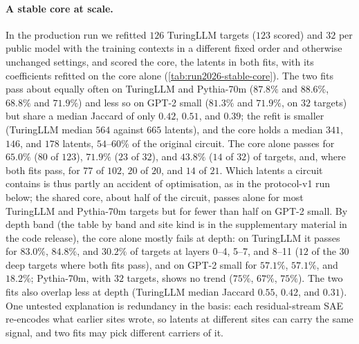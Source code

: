 \documentclass[10pt]{article}
\begin{document}
\paragraph{A stable core at scale.}
In the production run we refitted $126$ TuringLLM targets ($123$ scored) and $32$ per public model with the training contexts in a different fixed order and otherwise unchanged settings, and scored the core, the latents in both fits, with its coefficients refitted on the core alone (\cref{tab:run2026-stable-core}).
The two fits pass about equally often on TuringLLM and Pythia-70m ($87.8\%$ and $88.6\%$, $68.8\%$ and $71.9\%$) and less so on GPT-2 small ($81.3\%$ and $71.9\%$, on $32$ targets) but share a median Jaccard of only $0.42$, $0.51$, and $0.39$; the refit is smaller (TuringLLM median $564$ against $665$ latents), and the core holds a median $341$, $146$, and $178$ latents, $54$--$60\%$ of the original circuit.
The core alone passes for $65.0\%$ ($80$ of $123$), $71.9\%$ ($23$ of $32$), and $43.8\%$ ($14$ of $32$) of targets, and, where both fits pass, for $77$ of $102$, $20$ of $20$, and $14$ of $21$.
Which latents a circuit contains is thus partly an accident of optimisation, as in the protocol-v1 run below; the shared core, about half of the circuit, passes alone for most TuringLLM and Pythia-70m targets but for fewer than half on GPT-2 small.
By depth band (the table by band and site kind is in the supplementary material in the code release), the core alone mostly fails at depth: on TuringLLM it passes for $83.0\%$, $84.8\%$, and $30.2\%$ of targets at layers 0--4, 5--7, and 8--11 ($12$ of the $30$ deep targets where both fits pass), and on GPT-2 small for $57.1\%$, $57.1\%$, and $18.2\%$; Pythia-70m, with $32$ targets, shows no trend ($75\%$, $67\%$, $75\%$).
The two fits also overlap less at depth (TuringLLM median Jaccard $0.55$, $0.42$, and $0.31$).
One untested explanation is redundancy in the basis: each residual-stream SAE re-encodes what earlier sites wrote, so latents at different sites can carry the same signal, and two fits may pick different carriers of it.
\end{document}
